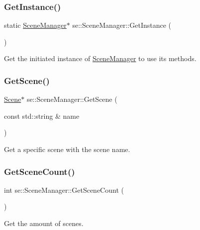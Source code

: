 \subsubsection{\texorpdfstring{Get\+Instance()}{GetInstance()}}
{\footnotesize\ttfamily static \mbox{\hyperlink{classse_1_1_scene_manager}{Scene\+Manager}}$\ast$ se\+::\+Scene\+Manager\+::\+Get\+Instance (\begin{DoxyParamCaption}{ }\end{DoxyParamCaption})\hspace{0.3cm}{\ttfamily [static]}}

Get the initiated instance of \mbox{\hyperlink{classse_1_1_scene_manager}{Scene\+Manager}} to use its methods. \mbox{\label{classse_1_1_scene_manager_a07360d102e47455f497c844d7ad36ecb}} 
\subsubsection{\texorpdfstring{Get\+Scene()}{GetScene()}}
{\footnotesize\ttfamily \mbox{\hyperlink{classse_1_1_scene}{Scene}}$\ast$ se\+::\+Scene\+Manager\+::\+Get\+Scene (\begin{DoxyParamCaption}\item[{const std\+::string \&}]{name }\end{DoxyParamCaption})}

Get a specific scene with the scene name. \mbox{\label{classse_1_1_scene_manager_aac6929d7dfd933c4d40fbf66b3740321}} 
\subsubsection{\texorpdfstring{Get\+Scene\+Count()}{GetSceneCount()}}
{\footnotesize\ttfamily int se\+::\+Scene\+Manager\+::\+Get\+Scene\+Count (\begin{DoxyParamCaption}{ }\end{DoxyParamCaption})}

Get the amount of scenes. \mbox{\label{classse_1_1_scene_manager_a354707c12a744c1f86e9433b312f8203}} 
